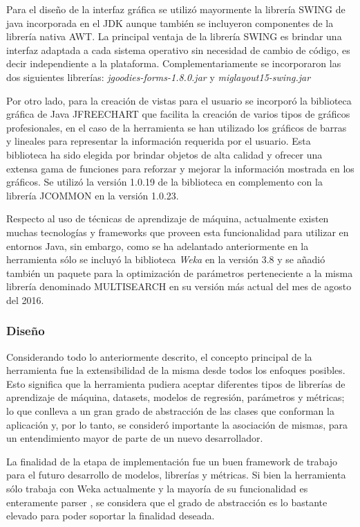 Para el diseño de la interfaz gráfica se utilizó mayormente la librería
SWING de java incorporada en el \ac{JDK} aunque también se incluyeron
componentes de la librería nativa AWT. La principal ventaja de la
librería SWING es brindar una interfaz adaptada a cada sistema operativo
sin necesidad de cambio de código, es decir independiente a la plataforma.
Complementariamente se incorporaron las dos siguientes librerías:
\emph{jgoodies-forms-1.8.0.jar} y \emph{miglayout15-swing.jar}

Por otro lado, para la creación de vistas para el usuario se incorporó
la biblioteca gráfica de Java JFREECHART que facilita la creación
de varios tipos de gráficos profesionales, en el caso de la herramienta
se han utilizado los gráficos de barras y lineales para representar
la información requerida por el usuario. Esta biblioteca ha sido elegida
por brindar objetos de alta calidad y ofrecer una extensa gama de
funciones para reforzar y mejorar la información mostrada en los gráficos.
Se utilizó la versión 1.0.19 de la biblioteca en complemento con la
librería JCOMMON en la versión 1.0.23. 

Respecto al uso de técnicas de aprendizaje de máquina, actualmente
existen muchas tecnologías y frameworks que proveen esta funcionalidad
para utilizar en entornos Java, sin embargo, como se ha adelantado
anteriormente en la herramienta sólo se incluyó la biblioteca \emph{Weka}
en la versión 3.8 y se añadió también un paquete para la optimización
de parámetros perteneciente a la misma librería denominado MULTISEARCH
en su versión más actual del mes de agosto del 2016. 


\subsubsection*{Diseño}

Considerando todo lo anteriormente descrito, el concepto principal
de la herramienta fue la extensibilidad de la misma desde todos los
enfoques posibles. Esto significa que la herramienta pudiera aceptar
diferentes tipos de librerías de aprendizaje de máquina, datasets,
modelos de regresión, parámetros y métricas; lo que conlleva a un
gran grado de abstracción de las clases que conforman la aplicación
y, por lo tanto, se consideró importante la asociación de mismas,
para un entendimiento mayor de parte de un nuevo desarrollador.

La finalidad de la etapa de implementación fue un buen framework de
trabajo para el futuro desarrollo de modelos, librerías y métricas.
Si bien la herramienta sólo trabaja con Weka actualmente y la mayoría
de su funcionalidad es enteramente parser , se considera que el grado
de abstracción es lo bastante elevado para poder soportar la finalidad
deseada.

